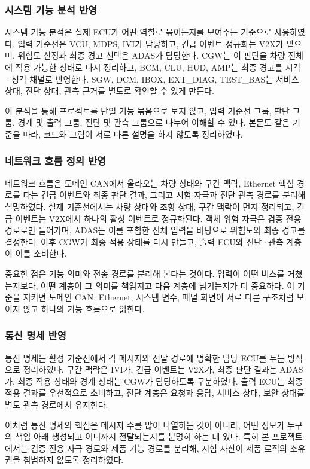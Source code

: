 \documentclass[11pt,a4paper]{article}
\begin{document}
\subsubsection{시스템 기능 분석 반영}
시스템 기능 분석은 실제 ECU가 어떤 역할로 묶이는지를 보여주는 기준으로 사용하였다. 입력 기준선은 VCU, MDPS, IVI가 담당하고, 긴급 이벤트 정규화는 V2X가 맡으며, 위험도 산정과 최종 경고 선택은 ADAS가 담당한다. CGW는 이 판단을 차량 전체에 적용 가능한 상태로 다시 정리하고, BCM, CLU, HUD, AMP는 최종 경고를 시각·청각 채널로 반영한다. SGW, DCM, IBOX, EXT\_DIAG, TEST\_BAS는 서비스 상태, 진단 상태, 관측 근거를 별도로 확인할 수 있게 만든다.

이 분석을 통해 프로젝트를 단일 기능 묶음으로 보지 않고, 입력 기준선 그룹, 판단 그룹, 경계 및 출력 그룹, 진단 및 관측 그룹으로 나누어 이해할 수 있다. 본문도 같은 기준을 따라, 코드와 그림이 서로 다른 설명을 하지 않도록 정리하였다.

\subsubsection{네트워크 흐름 정의 반영}
네트워크 흐름은 도메인 CAN에서 올라오는 차량 상태와 구간 맥락, Ethernet 핵심 경로를 타는 긴급 이벤트와 최종 판단 결과, 그리고 시험 자극과 진단 관측 경로를 분리해 설명하였다. 실제 기준선에서는 차량 상태와 조향 상태, 구간 맥락이 먼저 정리되고, 긴급 이벤트는 V2X에서 하나의 활성 이벤트로 정규화된다. 객체 위험 자극은 검증 전용 경로로만 들어가며, ADAS는 이를 포함한 전체 입력을 바탕으로 위험도와 최종 경고를 결정한다. 이후 CGW가 최종 적용 상태를 다시 만들고, 출력 ECU와 진단·관측 계층이 이를 소비한다.

중요한 점은 기능 의미와 전송 경로를 분리해 본다는 것이다. 입력이 어떤 버스를 거쳤는지보다, 어떤 계층이 그 의미를 책임지고 다음 계층에 넘기는지가 더 중요하다. 이 기준을 지키면 도메인 CAN, Ethernet, 시스템 변수, 패널 화면이 서로 다른 구조처럼 보이지 않고 하나의 기능 흐름으로 읽힌다.

\subsubsection{통신 명세 반영}
통신 명세는 활성 기준선에서 각 메시지와 전달 경로에 명확한 담당 ECU를 두는 방식으로 정리하였다. 구간 맥락은 IVI가, 긴급 이벤트는 V2X가, 최종 판단 결과는 ADAS가, 최종 적용 상태와 경계 상태는 CGW가 담당하도록 구분하였다. 출력 ECU는 최종 적용 결과를 우선적으로 소비하고, 진단 계층은 요청과 응답, 서비스 상태, 보안 상태를 별도 관측 경로에서 유지한다.

이처럼 통신 명세의 핵심은 메시지 수를 많이 나열하는 것이 아니라, 어떤 정보가 누구의 책임 아래 생성되고 어디까지 전달되는지를 분명히 하는 데 있다. 특히 본 프로젝트에서는 검증 전용 자극 경로와 제품 기능 경로를 분리해, 시험 자산이 제품 로직의 소유권을 침범하지 않도록 정리하였다.
\end{document}
